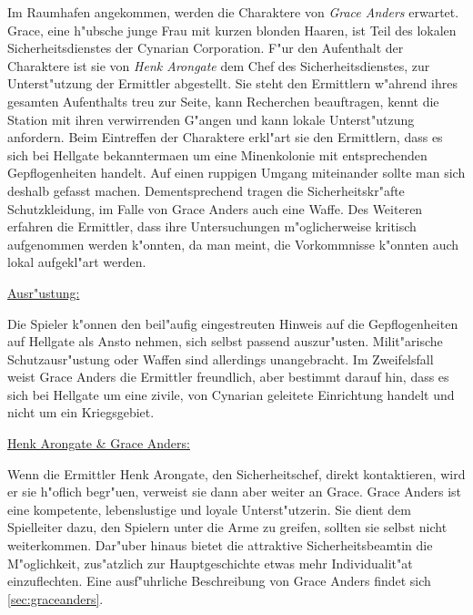 Im Raumhafen angekommen, werden die Charaktere von \emph{Grace Anders} erwartet. Grace, eine h"ubsche junge Frau mit kurzen blonden Haaren, ist Teil des lokalen Sicherheitsdienstes der Cynarian Corporation. F"ur den Aufenthalt der Charaktere ist sie von \emph{Henk Arongate} dem Chef des Sicherheitsdienstes, zur Unterst"utzung der Ermittler abgestellt. Sie steht den Ermittlern w"ahrend ihres gesamten Aufenthalts treu zur Seite, kann Recherchen beauftragen, kennt die Station mit ihren verwirrenden G"angen und kann lokale Unterst"utzung anfordern. Beim Eintreffen der Charaktere erkl"art sie den Ermittlern, dass es sich bei Hellgate bekannterma\3en um eine Minenkolonie mit entsprechenden Gepflogenheiten handelt. Auf einen ruppigen Umgang miteinander sollte man sich deshalb gefasst machen. Dementsprechend tragen die Sicherheitskr"afte Schutzkleidung, im Falle von Grace Anders auch eine Waffe. Des Weiteren erfahren die Ermittler, dass ihre Untersuchungen m"oglicherweise kritisch aufgenommen werden k"onnten, da man meint, die Vorkommnisse k"onnten auch lokal aufgekl"art werden.

\begin{remarks}
	\underline{Ausr"ustung:}

	Die Spieler k"onnen den beil"aufig eingestreuten Hinweis auf die Gepflogenheiten auf Hellgate als Ansto\3 nehmen, sich selbst passend auszur"usten. Milit"arische Schutzausr"ustung oder Waffen sind allerdings unangebracht. Im Zweifelsfall weist Grace Anders die Ermittler freundlich, aber bestimmt darauf hin, dass es sich bei Hellgate um eine zivile, von Cynarian geleitete Einrichtung handelt und nicht um ein Kriegsgebiet.

	\underline{Henk Arongate \& Grace Anders:}
	
	Wenn die Ermittler Henk Arongate, den Sicherheitschef, direkt kontaktieren, wird er sie h"oflich begr"u\3en, verweist sie dann aber weiter an Grace. Grace Anders ist eine kompetente, lebenslustige und loyale Unterst"utzerin. Sie dient dem Spielleiter dazu, den Spielern unter die Arme zu greifen, sollten sie selbst nicht weiterkommen. Dar"uber hinaus bietet die attraktive Sicherheitsbeamtin die M"oglichkeit, zus"atzlich zur Hauptgeschichte etwas mehr Individualit"at einzuflechten. Eine ausf"uhrliche Beschreibung von Grace Anders findet sich \cref{sec:graceanders}.
\end{remarks}


